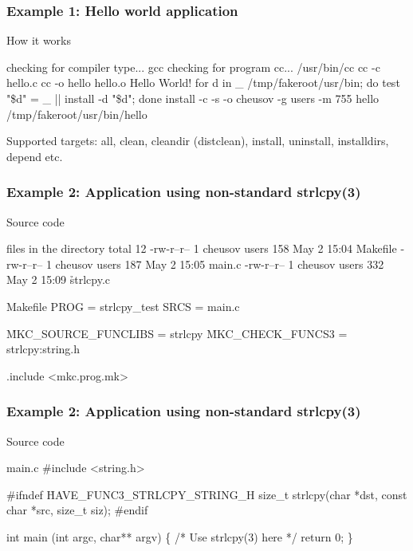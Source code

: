 \documentclass[hyperref={colorlinks=true}]{beamer}
\begin{document}
\begin{frame}[fragile]
  \frametitle{Example 1: Hello world application}

\begin{block}{How it works}
\begin{CodeNoLabel}
checking for compiler type... gcc
checking for program cc... /usr/bin/cc
cc     -c hello.c
cc   -o hello hello.o
Hello World!
for d in \_ /tmp/fakeroot/usr/bin; do  test "\$d" = \_ ||
   install -d "\$d";  done
install   -c -s  -o cheusov -g users -m 755
   hello /tmp/fakeroot/usr/bin/hello
\prompt{\$}
\end{CodeNoLabel}
\end{block}
Supported targets: all, clean, cleandir (distclean), install,
uninstall, installdirs, depend etc.
\end{frame}

\begin{frame}[fragile]
  \frametitle{Example 2: Application using non-standard strlcpy(3)}

\begin{block}{Source code}
  \begin{Code}{files in the directory}
total 12
-rw-r--r--  1 cheusov  users  158 May  2 15:04 Makefile
-rw-r--r--  1 cheusov  users  187 May  2 15:05 main.c
-rw-r--r--  1 cheusov  users  332 May  2 15:09 \h{strlcpy.c}
\prompt{\$}
  \end{Code}

  \begin{Code}{Makefile}
PROG =                 strlcpy_test
SRCS =                 main.c

\h{MKC\_SOURCE\_FUNCLIBS} =  strlcpy
\h{MKC\_CHECK\_FUNCS3} =     strlcpy:string.h

.include <mkc.prog.mk>
  \end{Code}
\end{block}

\end{frame}

\begin{frame}[fragile]
  \frametitle{Example 2: Application using non-standard strlcpy(3)}

\begin{block}{Source code}
\begin{Code}{main.c}
#include <string.h>

#ifndef \h{HAVE\_FUNC3\_STRLCPY\_STRING\_H}
size_t strlcpy(char *dst, const char *src, size_t siz);
#endif

int main (int argc, char** argv)
\{
    /*    Use strlcpy(3) here    */
    return 0;
\}
\end{Code}
\end{block}
\end{frame}
\end{document}
